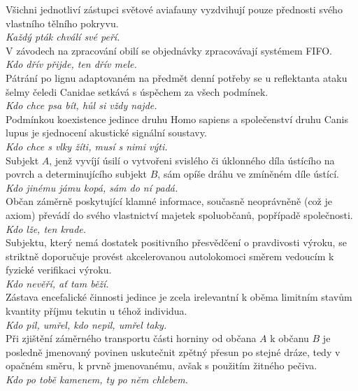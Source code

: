 \begin{multicols}{\value{columnsgames}}
\noindent
Všichni jednotliví zástupci světové aviafauny vyzdvihují pouze
přednosti svého vlastního tělního pokryvu.\\[1 mm]
{\sl Každý pták chválí své peří.}\\

\noindent
V závodech na zpracování obilí se objednávky zpracovávají
systémem FIFO.\\[1 mm]
{\sl Kdo dřív přijde, ten dřív mele.}\\

\noindent
Pátrání po lignu adaptovaném na předmět denní potřeby se
u reflektanta ataku šelmy čeledi Canidae setkává s úspěchem za
všech podmínek.\\[1 mm]
{\sl Kdo chce psa bít, hůl si vždy najde.}\\

\noindent
Podmínkou koexistence jedince druhu Homo sapiens a společenství
druhu Canis lupus je sjednocení akustické signální soustavy.\\[1 mm]
{\sl Kdo chce s vlky žíti, musí s nimi výti.}\\

\noindent
Subjekt $A$, jenž vyvíjí úsilí o vytvořeni svislého či úklonného
díla ústícího na povrch a determinujícího subjekt $B$, sám opíše
dráhu ve zmíněném díle ústící.\\[1 mm]
{\sl Kdo jinému jámu kopá, sám do ní padá.}\\

\noindent
Občan záměrně poskytující klamné informace, současně neoprávněně
(což je axiom) převádí do svého vlastnictví majetek spoluobčanů,
popřípadě společnosti.\\[1 mm]
{\sl Kdo lže, ten krade.}\\

\noindent
Subjektu, který nemá dostatek positivního přesvědčení o pravdivosti
výroku, se striktně doporučuje provést akcelerovanou autolokomoci
směrem vedoucím k fyzické verifikaci výroku.\\[1 mm]
{\sl Kdo nevěří, ať tam běží.}\\

\noindent
Zástava encefalické činnosti jedince je zcela irelevantní k oběma
limitním stavům kvantity příjmu tekutin u téhož individua.\\[1 mm]
{\sl Kdo pil, umřel, kdo nepil, umřel taky.}\\

\noindent
Při zjištění záměrného transportu části horniny od občana
$A$ k občanu $B$ je posledně jmenovaný povinen uskutečnit zpětný
přesun po stejné dráze, tedy v opačném směru, k prvně jmenovanému,
avšak s použitím žitného pečiva.\\[1 mm]
{\sl Kdo po tobě kamenem, ty po něm chlebem.}\\


\end{multicols}
